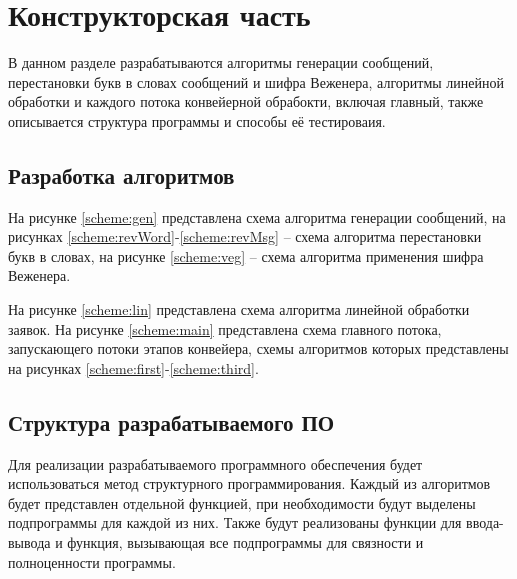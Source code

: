\chapter{Конструкторская часть}

В данном разделе разрабатываются алгоритмы генерации сообщений, перестановки
букв в словах сообщений и шифра Веженера, алгоритмы линейной обработки и
каждого потока конвейерной обрабокти, включая главный, также описывается
структура программы и способы её тестироваия.

\section{Разработка алгоритмов}

На рисунке \ref{scheme:gen} представлена схема алгоритма генерации сообщений,
на рисунках \ref{scheme:revWord}-\ref{scheme:revMsg} -- схема алгоритма
перестановки букв в словах, на рисунке \ref{scheme:veg} -- схема алгоритма
применения шифра Веженера. 

На рисунке \ref{scheme:lin} представлена схема алгоритма линейной обработки
заявок. На рисунке \ref{scheme:main} представлена схема главного потока,
запускающего потоки этапов конвейера, схемы алгоритмов которых представлены на
рисунках \ref{scheme:first}-\ref{scheme:third}.


\clearpage
\section{Структура разрабатываемого ПО}

Для реализации разрабатываемого программного обеспечения будет использоваться
метод структурного программирования. Каждый из алгоритмов будет представлен
отдельной функцией, при необходимости будут выделены подпрограммы для каждой из
них. Также будут реализованы функции для ввода-вывода и функция, вызывающая все
подпрограммы для связности и полноценности программы.

